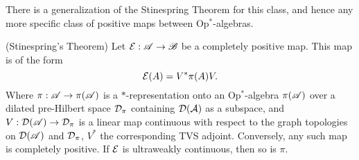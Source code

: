 \documentclass[../main.tex]{subfiles}
\begin{document}
There is a generalization of the Stinespring Theorem for this class, and hence any more specific class of positive maps between
Op$^*$-algebras.

\begin{theorem}

	(Stinespring's Theorem) Let $\mathcal{E}: \mathscr{A} \to \mathscr{B}$ be a completely positive map. This map is of the form
	\[\mathcal{E}(A) = V^*\pi(A)V.\] Where $\pi: \mathscr{A} \to \pi(\mathscr{A})$ is a $*$-representation onto an Op$^*$-algebra 
	$\pi(\mathscr{A})$ over a dilated pre-Hilbert space $\mathcal{D}_\pi$ containing $\mathcal{D}(\mathcal{A})$ as a subspace, and 
	$V:\mathcal{D}(\mathscr{A}) \to \mathcal{D}_\pi$ is a linear map continuous with respect to the graph topologies on $\mathcal{D}(\mathscr{A})$
	and $\mathcal{D}_\pi$, $V^*$ the corresponding TVS adjoint. Conversely, any such map is completely positive. If $\mathcal{E}$ is 
	ultraweakly continuous, then so is $\pi$.

\end{theorem}
\end{document}
